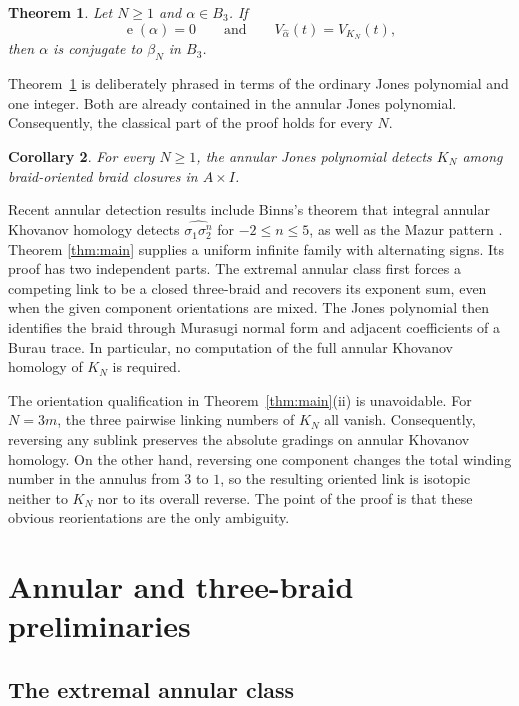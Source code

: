 \documentclass[10pt,a4paper]{amsart}
\newtheorem{theorem}{Theorem}[section]
\newtheorem{corollary}[theorem]{Corollary}
\newcommand{\e}{\operatorname{e}}
\begin{document}
\begin{theorem}\label{thm:rigidity}
Let \(N\geq 1\) and \(\alpha\in B_3\).  If
\[
  \e(\alpha)=0
  \qquad\text{and}\qquad
  V_{\widehat\alpha}(t)=V_{K_N}(t),
\]
then \(\alpha\) is conjugate to \(\beta_N\) in \(B_3\).
\end{theorem}

Theorem~\ref{thm:rigidity} is deliberately phrased in terms of the ordinary Jones
polynomial and one integer.  Both are already contained in the annular Jones
polynomial.  Consequently, the classical part of the proof holds for every \(N\).

\begin{corollary}\label{cor:annular-jones}
For every \(N\geq 1\), the annular Jones polynomial detects \(K_N\) among
braid-oriented braid closures in \(A\times I\).
\end{corollary}

Recent annular detection results include Binns's theorem that integral annular
Khovanov homology detects \(\widehat{\sigma_1\sigma_2^n}\) for
\(-2\leq n\leq 5\), as well as the Mazur pattern \cite{Binns}.  Theorem
\ref{thm:main} supplies a uniform infinite family with alternating signs.  Its proof
has two independent parts.  The extremal annular class first forces a competing link
to be a closed three-braid and recovers its exponent sum, even when the given component
orientations are mixed.  The Jones polynomial then identifies the braid through
Murasugi normal form and adjacent coefficients of a Burau trace.  In particular, no
computation of the full annular Khovanov homology of \(K_N\) is required.

The orientation qualification in Theorem~\ref{thm:main}(ii) is unavoidable.  For
\(N=3m\), the three pairwise linking numbers of \(K_N\) all vanish.  Consequently,
reversing any sublink preserves the absolute gradings on annular Khovanov homology.
On the other hand, reversing one component changes the total winding number in the
annulus from \(3\) to \(1\), so the resulting oriented link is isotopic neither to
\(K_N\) nor to its overall reverse.  The point of the proof is that these obvious
reorientations are the only ambiguity.

\section{Annular and three-braid preliminaries}

\subsection{The extremal annular class}
\end{document}
